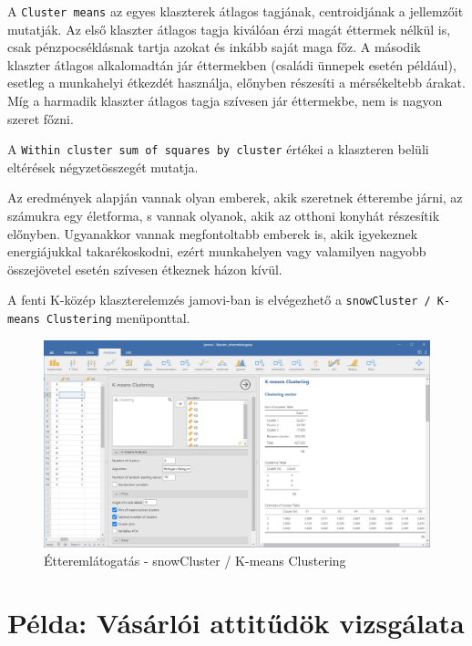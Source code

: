 \documentclass[
  letterpaper,
]{krantz}
\begin{document}
A \texttt{Cluster\ means} az egyes klaszterek átlagos tagjának,
centroidjának a jellemzőit mutatják. Az első klaszter átlagos tagja
kiválóan érzi magát éttermek nélkül is, csak pénzpocséklásnak tartja
azokat és inkább saját maga főz. A második klaszter átlagos alkalomadtán
jár éttermekben (családi ünnepek esetén például), esetleg a munkahelyi
étkezdét használja, előnyben részesíti a mérsékeltebb árakat. Míg a
harmadik klaszter átlagos tagja szívesen jár éttermekbe, nem is nagyon
szeret főzni.

A \texttt{Within\ cluster\ sum\ of\ squares\ by\ cluster} értékei a
klaszteren belüli eltérések négyzetösszegét mutatja.

Az eredmények alapján vannak olyan emberek, akik szeretnek étterembe
járni, az számukra egy életforma, s vannak olyanok, akik az otthoni
konyhát részesítik előnyben. Ugyanakkor vannak megfontoltabb emberek is,
akik igyekeznek energiájukkal takarékoskodni, ezért munkahelyen vagy
valamilyen nagyobb összejövetel esetén szívesen étkeznek házon kívül.

A fenti K-közép klaszterelemzés jamovi-ban is elvégezhető a
\texttt{snowCluster\ /\ K-means\ Clustering} menüponttal.

\begin{figure}

{\centering \includegraphics{./images/klaszter_etterem_01.jpg}

}

\caption{Étteremlátogatás - snowCluster / K-means Clustering}

\end{figure}

\hypertarget{puxe9lda-vuxe1suxe1rluxf3i-attitux171duxf6k-vizsguxe1lata}{%
\section{Példa: Vásárlói attitűdök
vizsgálata}\label{puxe9lda-vuxe1suxe1rluxf3i-attitux171duxf6k-vizsguxe1lata}}
\end{document}
